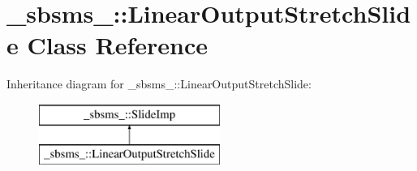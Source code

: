 \hypertarget{class__sbsms___1_1_linear_output_stretch_slide}{}\section{\+\_\+sbsms\+\_\+\+:\+:Linear\+Output\+Stretch\+Slide Class Reference}
\label{class__sbsms___1_1_linear_output_stretch_slide}
Inheritance diagram for \+\_\+sbsms\+\_\+\+:\+:Linear\+Output\+Stretch\+Slide\+:\begin{figure}[H]
\begin{center}
\leavevmode
\includegraphics[height=2.000000cm]{class__sbsms___1_1_linear_output_stretch_slide}
\end{center}
\end{figure}
